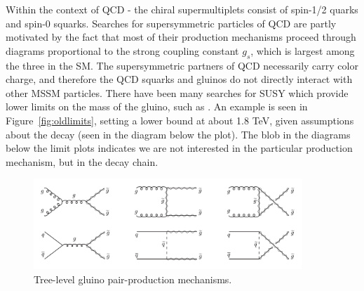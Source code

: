 Within the context of QCD - the chiral supermultiplets consist of spin-1/2 quarks and spin-0 squarks. Searches for supersymmetric particles of QCD are partly motivated by the fact that most of their production mechanisms proceed through diagrams proportional to the strong coupling constant $g_{s}$, which is largest among the three in the SM. The supersymmetric partners of QCD necessarily carry color charge, and therefore the QCD squarks and gluinos do not directly interact with other MSSM particles. There have been many searches for SUSY which provide lower limits on the mass of the gluino, such as \cite{CMS-SUS-16-033, CMS-SUS-15-002}. An example is seen in Figure~\ref{fig:oldlimits}, setting a lower bound at about 1.8 TeV, given assumptions about the decay (seen in the diagram below the plot). The blob in the diagrams below the limit plots indicates we are not interested in the particular production mechanism, but in the decay chain.

\begin{figure}
\centering
\includegraphics[width=0.9\textwidth]{figs/gluinopair}
\caption{Tree-level gluino pair-production mechanisms.}
\label{fig:gluinopair}
\end{figure}

